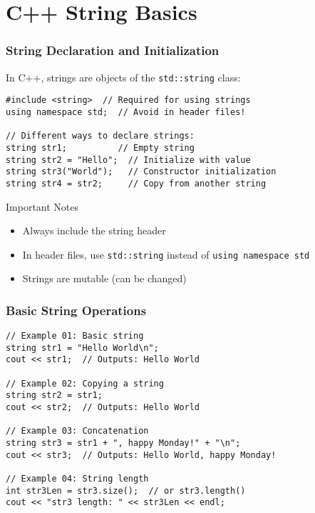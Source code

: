\documentclass{beamer}
\begin{document}
\section{C++ String Basics}

\begin{frame}[fragile]
    \frametitle{String Declaration and Initialization}
    
    In C++, strings are objects of the \texttt{std::string} class:
    
    \begin{lstlisting}
#include <string>  // Required for using strings
using namespace std;  // Avoid in header files!

// Different ways to declare strings:
string str1;          // Empty string
string str2 = "Hello";  // Initialize with value
string str3("World");   // Constructor initialization
string str4 = str2;     // Copy from another string
    \end{lstlisting}
    
    \begin{block}{Important Notes}
        \begin{itemize}
            \item Always include the string header
            \item In header files, use \texttt{std::string} instead of \texttt{using namespace std}
            \item Strings are mutable (can be changed)
        \end{itemize}
    \end{block}
\end{frame}

\begin{frame}[fragile]
    \frametitle{Basic String Operations}
    
    \begin{lstlisting}
// Example 01: Basic string
string str1 = "Hello World\n";
cout << str1;  // Outputs: Hello World

// Example 02: Copying a string
string str2 = str1;
cout << str2;  // Outputs: Hello World

// Example 03: Concatenation
string str3 = str1 + ", happy Monday!" + "\n";
cout << str3;  // Outputs: Hello World, happy Monday!

// Example 04: String length
int str3Len = str3.size();  // or str3.length()
cout << "str3 length: " << str3Len << endl;
    \end{lstlisting}
\end{frame}
\end{document}
